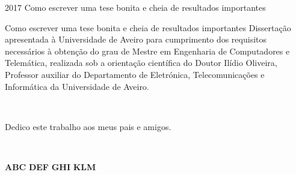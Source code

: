 \documentclass[11pt,twoside,a4paper]{report}
\def\ThesisYear{2017}
\begin{document}
%
%

\TitlePage
  \HEADER{\BAR\FIG{}}
         {\ThesisYear}
        {Como escrever uma tese bonita e cheia de resultados importantes}
\EndTitlePage
\titlepage\ \endtitlepage %


%
%

\TitlePage
  \HEADER{}{\ThesisYear}
        {Como escrever uma tese bonita e cheia de resultados importantes}
  \vspace*{15mm}
  \TEXT{}
       {Disserta\c c\~ao apresentada \`a Universidade de Aveiro para cumprimento dos requisitos necess\'arios \`a obten\c c\~ao do
        grau de Mestre em Engenharia de Computadores e Telem\'atica, realizada sob a orienta\c c\~ao cient\'ifica do Doutor Il\'idio Oliveira, Professor auxiliar do Departamento de Eletr\'onica, Telecomunica\c c\~oes e Inform\'atica da Universidade de Aveiro.}
\EndTitlePage
\titlepage\ \endtitlepage %


\titlepage\ 

\vspace*{30mm}\begin{flushright}
Dedico este trabalho aos meus pais e amigos.
\end{flushright}
\endtitlepage

\titlepage\ \endtitlepage %

\TitlePage
  \vspace*{55mm}
       {}
       {\textbf{ABC}}
  \vspace*{5mm}
       {\textbf{DEF}}
  \vspace*{5mm}
  \TEXT{}
       {\textbf{GHI}}
  \vspace*{5mm}
  \TEXT{}
       {\textbf{KLM}}
\EndTitlePage
\titlepage\ \endtitlepage %
\end{document}
